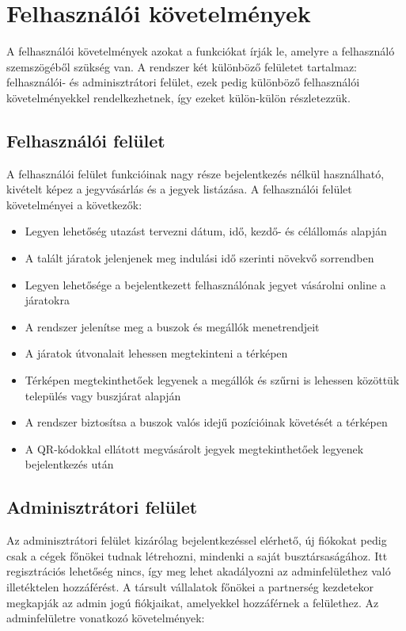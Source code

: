 \section{Felhasználói követelmények}
A felhasználói követelmények azokat a funkciókat írják le, amelyre a felhasználó szemszögéből szükség van. A rendszer két különböző felületet tartalmaz: felhasználói- és adminisztrátori felület, ezek pedig különböző felhasználói követelményekkel rendelkezhetnek, így ezeket külön-külön részletezzük.

\subsection{Felhasználói felület}
A felhasználói felület funkcióinak nagy része bejelentkezés nélkül használható, kivételt képez a jegyvásárlás és a jegyek listázása. A felhasználói felület követelményei a következők:

\begin{itemize}
  \item Legyen lehetőség utazást tervezni dátum, idő, kezdő- és célállomás alapján
  \item A talált járatok jelenjenek meg indulási idő szerinti növekvő sorrendben
  \item Legyen lehetősége a bejelentkezett felhasználónak jegyet vásárolni online a járatokra
  \item A rendszer jelenítse meg a buszok és megállók menetrendjeit
  \item A járatok útvonalait lehessen megtekinteni a térképen
  \item Térképen megtekinthetőek legyenek a megállók és szűrni is lehessen közöttük település vagy buszjárat alapján
  \item A rendszer biztosítsa a buszok valós idejű pozícióinak követését a térképen
  \item A QR-kódokkal ellátott megvásárolt jegyek megtekinthetőek legyenek bejelentkezés után
\end{itemize}

\subsection{Adminisztrátori felület}
Az adminisztrátori felület kizárólag bejelentkezéssel elérhető, új fiókokat pedig csak a cégek főnökei tudnak létrehozni, mindenki a saját busztársaságához. Itt regisztrációs lehetőség nincs, így meg lehet akadályozni az adminfelülethez való illetéktelen hozzáférést. A társult vállalatok főnökei a partnerség kezdetekor megkapják az admin jogú fiókjaikat, amelyekkel hozzáférnek a felülethez. Az adminfelületre vonatkozó követelmények:

